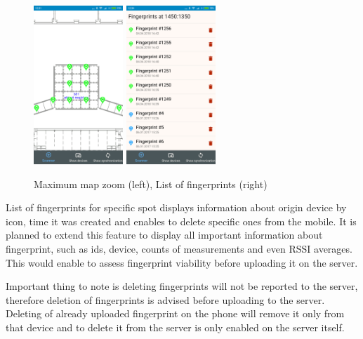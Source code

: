\begin{figure}[h!]
	\begin{centering}
		\includegraphics[width=0.30\textwidth]{img/map_zoom}
		\includegraphics[width=0.30\textwidth]{img/map_list_fingerprints}
		\par\end{centering}
	\caption{Maximum map zoom (left), List of fingerprints (right)\label{fig:map_zoom_and_list}}
	\label{fig06c05}
\end{figure}

List of fingerprints for specific spot displays information about origin device by icon, time it was created and enables to delete specific ones from the mobile. It is planned to extend this feature to display all important information about fingerprint, such as ids, device, counts of measurements and even RSSI averages. This would enable to assess fingerprint viability before uploading it on the server.

Important thing to note is deleting fingerprints will not be reported to the server, therefore deletion of fingerprints is advised before uploading to the server. Deleting of already uploaded fingerprint on the phone will remove it only from that device and to delete it from the server is only enabled on the server itself. 

